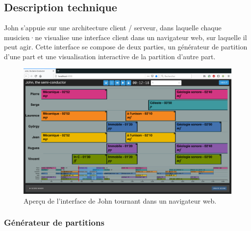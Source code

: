 \subsection{Description technique}

\noindent John s'appuie sur une architecture client / serveur, dans laquelle chaque musicien·ne visualise une interface client dans un navigateur web, sur laquelle il peut agir. Cette interface se compose de deux parties, un générateur de partition d'une part et une visualisation interactive de la partition d'autre part.
\begin{figure}[!htbp]
	\includegraphics[width=\textwidth]{gfx/notation/John-snapshot.png}
	\caption[John : capture écran de l'interface client]{Aperçu de l'interface de John tournant dans un navigateur web.}
	\label{fig:notation:john-snapshot}
\end{figure}
\subsubsection{Générateur de partitions}

